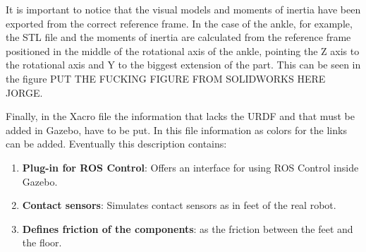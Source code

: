 It is important to notice that the visual models and moments of inertia have been exported from the correct reference frame.
In the case of the ankle, for example, the STL file and the moments of inertia are calculated from the reference frame positioned in the middle of the rotational axis of the ankle, pointing the Z axis to the rotational axis and Y to the biggest extension of the part.
This can be seen in the figure PUT THE FUCKING FIGURE FROM SOLIDWORKS HERE JORGE.

Finally, in the Xacro file the information that lacks the URDF and that must be added in Gazebo, have to be put.
In this file information as colors for the links can be added.
Eventually this description contains:
\begin{enumerate}
  \item \textbf{Plug-in for ROS Control}: Offers an interface for using ROS Control inside Gazebo.
  \item \textbf{Contact sensors}: Simulates contact sensors as in feet of the real robot.
  \item \textbf{Defines friction of the components}: as the friction between the feet and the floor.
\end{enumerate}

